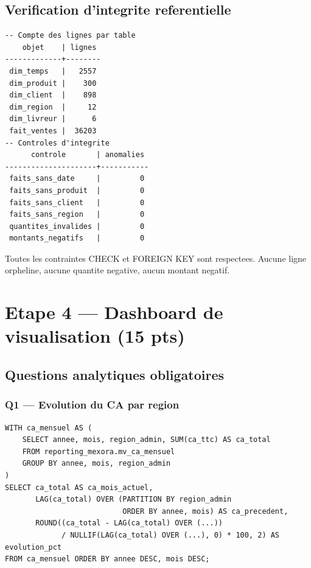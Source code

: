 \documentclass[12pt,a4paper]{article}
\begin{document}
\subsection{Verification d'integrite referentielle}

\begin{lstlisting}[style=sql, caption=Resultats check\_integrity.sql sur PostgreSQL]
-- Compte des lignes par table
    objet    | lignes
-------------+--------
 dim_temps   |   2557
 dim_produit |    300
 dim_client  |    898
 dim_region  |     12
 dim_livreur |      6
 fait_ventes |  36203
-- Controles d'integrite
      controle       | anomalies
---------------------+-----------
 faits_sans_date     |         0
 faits_sans_produit  |         0
 faits_sans_client   |         0
 faits_sans_region   |         0
 quantites_invalides |         0
 montants_negatifs   |         0
\end{lstlisting}

\begin{successbox}[title=Integrite referentielle : 0 anomalie sur 36\,203 faits]
Toutes les contraintes CHECK et FOREIGN KEY sont respectees. Aucune ligne orpheline,
aucune quantite negative, aucun montant negatif.
\end{successbox}

\newpage

\section{Etape 4 --- Dashboard de visualisation (15 pts)}

\subsection{Questions analytiques obligatoires}

\subsubsection{Q1 --- Evolution du CA par region}

\begin{lstlisting}[style=sql, caption=CA mensuel avec comparaison N-1]
WITH ca_mensuel AS (
    SELECT annee, mois, region_admin, SUM(ca_ttc) AS ca_total
    FROM reporting_mexora.mv_ca_mensuel
    GROUP BY annee, mois, region_admin
)
SELECT ca_total AS ca_mois_actuel,
       LAG(ca_total) OVER (PARTITION BY region_admin
                           ORDER BY annee, mois) AS ca_precedent,
       ROUND((ca_total - LAG(ca_total) OVER (...))
             / NULLIF(LAG(ca_total) OVER (...), 0) * 100, 2) AS evolution_pct
FROM ca_mensuel ORDER BY annee DESC, mois DESC;
\end{lstlisting}
\end{document}
